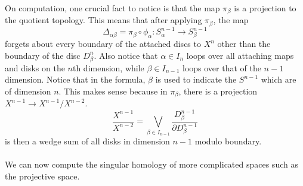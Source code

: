 \documentclass[a4paper]{article}
\begin{document}
On computation, one crucial fact to notice is that the map $\pi_\beta$ is a projection to the quotient topology. This means that after applying $\pi_\beta$, the map $$\Delta_{\alpha\beta}=\pi_\beta\circ\phi_\alpha:S_\alpha^{n-1}\to S_\beta^{n-1}$$ forgets about every boundary of the attached discs to $X^n$ other than the boundary of the disc $D_\beta^n$. Also notice that $\alpha\in I_n$ loops over all attaching maps and disks on the $n$th dimension, while $\beta\in I_{n-1}$ loops over that of the $n-1$ dimension. Notice that in the formula, $\beta$ is used to indicate the $S^{n-1}$ which are of dimension $n$. This makes sense because in $\pi_\beta$, there is a projection $X^{n-1}\to X^{n-1}/X^{n-2}$. $$\frac{X^{n-1}}{X^{n-2}}=\bigvee_{\beta\in I_{n-1}}\frac{D_\beta^{n-1}}{\partial D_\beta^{n-1}}$$ is then a wedge sum of all disks in dimension $n-1$ modulo boundary. \\~\\

We can now compute the singular homology of more complicated spaces such as the projective space. 
\end{document}
